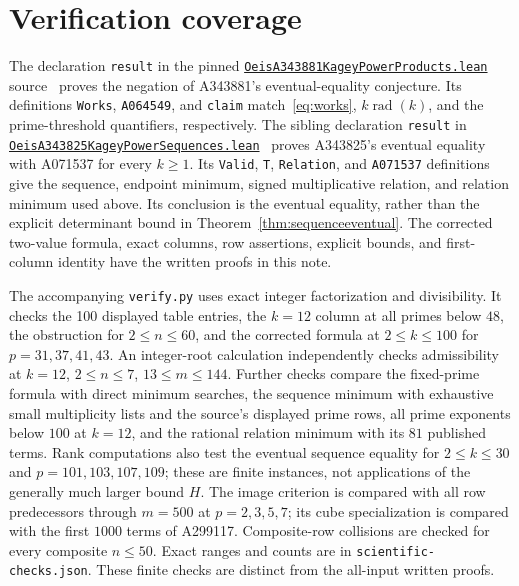 \documentclass[11pt]{article}
\DeclareMathOperator{\rad}{rad}
\begin{document}
\section{Verification coverage}
The declaration \texttt{result} in the pinned
\href{https://github.com/the-omega-institute/trureturing/blob/6974dba01daa1a25cc74b87a86c191e95fe2c681/D5/S3/Arith/Factorization/OeisA343881KageyPowerProducts.lean}{\texttt{OeisA343881KageyPowerProducts.lean}} source~\cite{lean}
proves the negation of A343881's eventual-equality conjecture.
Its definitions \texttt{Works}, \texttt{A064549}, and \texttt{claim}
match~\eqref{eq:works}, $k\rad(k)$, and the prime-threshold quantifiers,
respectively. The sibling declaration \texttt{result} in
\href{https://github.com/the-omega-institute/trureturing/blob/6974dba01daa1a25cc74b87a86c191e95fe2c681/D5/S3/Arith/Factorization/OeisA343825KageyPowerSequences.lean}{\texttt{OeisA343825KageyPowerSequences.lean}}~\cite{leansibling}
proves A343825's eventual equality with A071537 for every $k\ge1$.
Its \texttt{Valid}, \texttt{T}, \texttt{Relation}, and \texttt{A071537}
definitions give the sequence, endpoint minimum, signed multiplicative
relation, and relation minimum used above. Its conclusion is the eventual
equality, rather than the explicit determinant bound in
Theorem~\ref{thm:sequenceeventual}.
The corrected two-value formula, exact columns, row assertions, explicit
bounds, and first-column identity have the written proofs in this note.

The accompanying \texttt{verify.py} uses exact integer factorization and
divisibility. It checks the 100 displayed table entries, the $k=12$ column
at all primes below $48$, the obstruction for $2\le n\le60$, and the
corrected formula at $2\le k\le100$ for $p=31,37,41,43$.
An integer-root calculation independently checks admissibility at $k=12$,
$2\le n\le7$, $13\le m\le144$.
Further checks compare the fixed-prime formula with direct minimum searches,
the sequence minimum with exhaustive small multiplicity lists and the
source's displayed prime rows, all prime exponents below $100$ at $k=12$,
and the rational relation minimum with its $81$ published terms.
Rank computations also test the eventual sequence equality for
$2\le k\le30$ and $p=101,103,107,109$; these are finite instances,
not applications of the generally much larger bound $H$.
The image criterion is compared with all row predecessors through $m=500$
at $p=2,3,5,7$; its cube specialization is compared with the first $1000$
terms of A299117. Composite-row collisions are checked for every
composite $n\le50$.
Exact ranges and counts are in \texttt{scientific-checks.json}.
These finite checks are distinct from the all-input written proofs.
\end{document}
